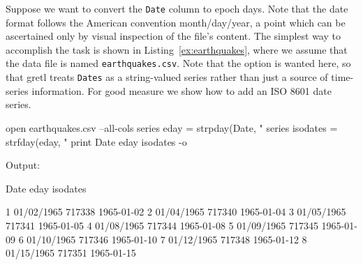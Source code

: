 \begin{center}
\end{center}

Suppose we want to convert the \texttt{Date} column to epoch
days. Note that the date format follows the American convention
month/day/year, a point which can be ascertained only by visual
inspection of the file's content. The simplest way to accomplish the
task is shown in Listing~\ref{ex:earthquakes}, where we assume that
the data file is named \texttt{earthquakes.csv}. Note that the
 option is wanted here, so that gretl treats
\texttt{Dates} as a string-valued series rather than just a source of
time-series information. For good measure we show how to add an ISO
8601 date series.

\begin{script}[htbp]
  \label{ex:earthquakes}
\begin{scodebit}
open earthquakes.csv --all-cols
series eday = strpday(Date, "%
series isodates = strfday(eday, "%
print Date eday isodates -o
\end{scodebit}
  
Output:
\begin{outbit}
          Date         eday     isodates

1   01/02/1965       717338   1965-01-02
2   01/04/1965       717340   1965-01-04
3   01/05/1965       717341   1965-01-05
4   01/08/1965       717344   1965-01-08
5   01/09/1965       717345   1965-01-09
6   01/10/1965       717346   1965-01-10
7   01/12/1965       717348   1965-01-12
8   01/15/1965       717351   1965-01-15
\end{outbit}
\end{script}


